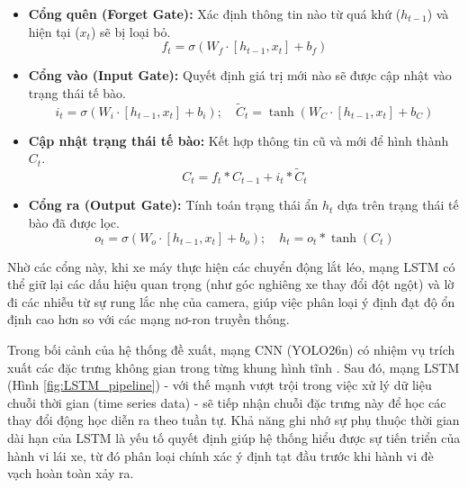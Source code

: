 	\begin{itemize}
    	\item \textbf{Cổng quên (Forget Gate):} Xác định thông tin nào từ quá khứ ($h_{t-1}$) và hiện tại ($x_t$) sẽ bị loại bỏ.
   		\begin{equation}
        	f_t = \sigma(W_f \cdot [h_{t-1}, x_t] + b_f)
    	\end{equation}
    	\item \textbf{Cổng vào (Input Gate):} Quyết định giá trị mới nào sẽ được cập nhật vào trạng thái tế bào.
    	\begin{equation}
        	i_t = \sigma(W_i \cdot [h_{t-1}, x_t] + b_i); \quad \tilde{C}_t = \tanh(W_C \cdot [h_{t-1}, x_t] + b_C)
    	\end{equation}
    	\item \textbf{Cập nhật trạng thái tế bào:} Kết hợp thông tin cũ và mới để hình thành $C_t$.
    	\begin{equation}
        	C_t = f_t * C_{t-1} + i_t * \tilde{C}_t
    	\end{equation}
    	\item \textbf{Cổng ra (Output Gate):} Tính toán trạng thái ẩn $h_t$ dựa trên trạng thái tế bào đã được lọc.
    	\begin{equation}
        	o_t = \sigma(W_o \cdot [h_{t-1}, x_t] + b_o); \quad h_t = o_t * \tanh(C_t)
    	\end{equation}
	\end{itemize}

	Nhờ các cổng này, khi xe máy thực hiện các chuyển động lắt léo, mạng LSTM có thể giữ lại các dấu hiệu quan trọng (như góc nghiêng xe thay đổi đột ngột) và lờ đi các nhiễu từ sự rung lắc nhẹ của camera, giúp việc phân loại ý định đạt độ ổn định cao hơn so với các mạng nơ-ron truyền thống.

	Trong bối cảnh của hệ thống đề xuất, mạng CNN (YOLO26n) có nhiệm vụ trích xuất các đặc trưng không gian trong từng khung hình tĩnh \cite{Ullah2018ActionRI}. Sau đó, mạng LSTM (Hình \ref{fig:LSTM_pipeline}) - với thế mạnh vượt trội trong việc xử lý dữ liệu chuỗi thời gian (time series data) \cite{Mohsen2021Industry4D} - sẽ tiếp nhận chuỗi đặc trưng này để học các thay đổi động học diễn ra theo tuần tự. Khả năng ghi nhớ sự phụ thuộc thời gian dài hạn của LSTM là yếu tố quyết định giúp hệ thống hiểu được sự tiến triển của hành vi lái xe, từ đó phân loại chính xác ý định tạt đầu trước khi hành vi đè vạch hoàn toàn xảy ra.
	
